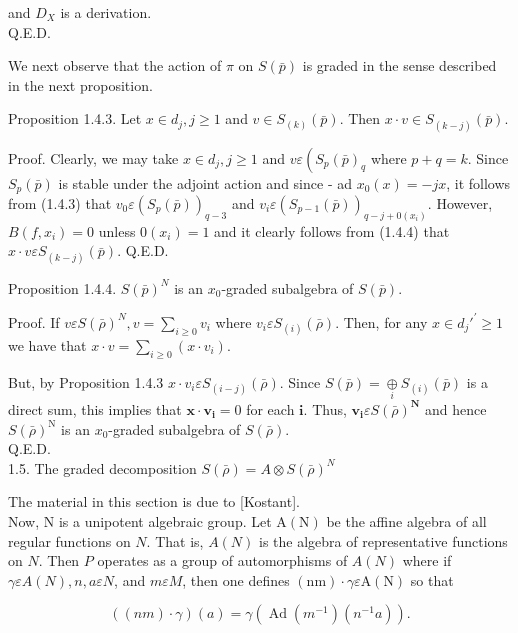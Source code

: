 \documentclass[10pt]{article}
\begin{document}
and $D_{X}$ is a derivation.\\
Q.E.D.

We next observe that the action of $\pi$ on $S(\bar{p})$ is graded in the sense described in the next proposition.

Proposition 1.4.3. Let $x \in d_{j}, j \geq 1$ and $v \in S_{(k)}(\bar{p})$. Then $x \cdot v \in S_{(k-j)}(\bar{p})$.

Proof. Clearly, we may take $x \in d_{j}, j \geq 1$ and $v \varepsilon\left(S_{p}(\bar{p})_{q}\right.$ where $p+q=k$. Since $S_{p}(\bar{p})$ is stable under the adjoint action and since - ad $x_{0}(x)=-j x$, it follows from (1.4.3) that $v_{0} \varepsilon\left(S_{p}(\bar{p})\right)_{q-3}$ and $v_{i} \varepsilon\left(S_{p-1}(\bar{p})\right)_{q-j+0\left(x_{i}\right)}$. However, $B\left(f, x_{i}\right)=0$ unless $0\left(x_{i}\right)=1$ and it clearly follows from (1.4.4) that $x \cdot v \varepsilon S_{(k-j)}(\bar{p})$. Q.E.D.

Proposition 1.4.4. $S(\bar{p})^{N}$ is an $x_{0}$-graded subalgebra of $S(\bar{p})$.

Proof. If $v \varepsilon S(\bar{\rho})^{N}, v=\sum_{i \geq 0} v_{i}$ where $v_{i} \varepsilon S_{(i)}(\bar{\rho})$. Then, for any $x \in d_{j} \prime^{\prime} \geq 1$ we have that $x \cdot v=\sum_{i \geq 0}\left(x \cdot v_{i}\right)$.

But, by Proposition 1.4.3 $x \cdot v_{i} \varepsilon S_{(i-j)}(\bar{\rho})$. Since $S(\bar{p})=\underset{i}{\oplus} S_{(i)}(\bar{p})$ is a direct sum, this implies that $\mathbf{x} \cdot \mathbf{v}_{\mathbf{i}}=0$ for each $\mathbf{i}$. Thus, $\mathbf{v}_{\mathbf{i}} \varepsilon S(\bar{\rho})^{\mathbf{N}}$ and hence $S(\bar{\rho})^{\mathrm{N}}$ is an $x_{0}$-graded subalgebra of $S(\bar{\rho})$.\\
Q.E.D.\\
1.5. The graded decomposition $S(\bar{\rho})=A \otimes S(\bar{\rho})^{N}$

The material in this section is due to [Kostant].\\
Now, N is a unipotent algebraic group. Let $\mathrm{A}(\mathrm{N})$ be the affine algebra of all regular functions on $N$. That is, $A(N)$ is the algebra of representative functions on $N$. Then $P$ operates as a group of automorphisms of $A(N)$ where if $\gamma \varepsilon A(N), n, a \varepsilon N$, and $m \varepsilon M$, then one defines $(\mathrm{nm}) \cdot \gamma \varepsilon \mathrm{A}(\mathrm{N})$ so that


\begin{equation*}
((n m) \cdot \gamma)(a)=\gamma\left(\operatorname{Ad}\left(m^{-1}\right)\left(n^{-1} a\right)\right) . \tag{1.5.1}
\end{equation*}
\end{document}
